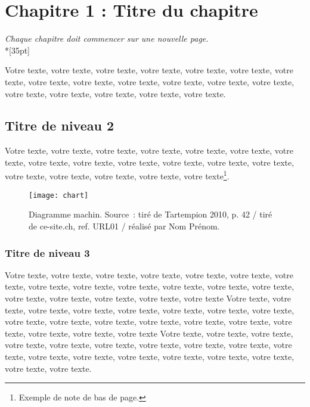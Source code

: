 \chapter{Chapitre 1 : Titre du chapitre}

\begin{center}
	\textit{Chaque chapitre doit commencer sur une nouvelle page.}\\*[35pt]
\end{center}

Votre texte, votre texte, votre texte, votre texte, votre texte, votre texte, votre texte, votre texte, votre texte, votre texte, votre texte, votre texte, votre texte, votre texte, votre texte, votre texte, votre texte, votre texte.


\section{Titre de niveau 2}

Votre texte, votre texte, votre texte, votre texte, votre texte, votre texte, votre texte, votre texte, votre texte, votre texte, votre texte, votre texte, votre texte, votre texte, votre texte, votre texte, votre texte, votre texte\footnote{Exemple de note de bas de page.}.

\begin{figure}[tbph!]
	\centering
	\texttt{[image: chart]}
	\caption[Diagramme machin]{Diagramme machin. Source : tiré de Tartempion 2010, p. 42 / tiré de ce-site.ch, ref. URL01 / réalisé par Nom Prénom.}
	\label{fig:chart1}
\end{figure}


\subsection{Titre de niveau 3}

Votre texte, votre texte, votre texte, votre texte, votre texte, votre texte, votre texte, votre texte, votre texte, votre texte, votre texte, votre texte, votre texte, votre texte, votre texte, votre texte, votre texte, votre texte Votre texte, votre texte, votre texte, votre texte, votre texte, votre texte, votre texte, votre texte, votre texte, votre texte, votre texte, votre texte, votre texte, votre texte, votre texte, votre texte, votre texte, votre texte Votre texte, votre texte, votre texte, votre texte, votre texte, votre texte, votre texte, votre texte, votre texte, votre texte, votre texte, votre texte, votre texte, votre texte, votre texte, votre texte, votre texte, votre texte.

